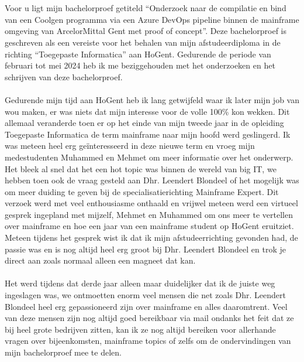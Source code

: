 
\chapter*{}%
\label{ch:voorwoord}

Voor u ligt mijn bachelorproef getiteld \enquote{Onderzoek naar de compilatie en bind van een Coolgen programma via een Azure DevOps pipeline binnen de mainframe omgeving van ArcelorMittal Gent met proof of concept}. 
Deze bachelorproef is geschreven als een vereiste voor het behalen van mijn afstudeerdiploma in de richting \enquote{Toegepaste Informatica} aan HoGent.
Gedurende de periode van februari tot mei 2024 heb ik me beziggehouden met het onderzoeken en het schrijven van deze bachelorproef. 
\\ \\
Gedurende mijn tijd aan HoGent heb ik lang getwijfeld waar ik later mijn job van wou maken, er was niets dat mijn interesse voor de volle 100\% kon wekken. 
Dit allemaal veranderde toen er op het einde van mijn tweede jaar in de opleiding Toegepaste Informatica de term mainframe naar mijn hoofd werd geslingerd. 
Ik was meteen heel erg geïnteresseerd in deze nieuwe term en vroeg mijn medestudenten Muhammed en Mehmet om meer informatie over het onderwerp. 
Het bleek al snel dat het een hot topic was binnen de wereld van big IT, we hebben toen ook de vraag gesteld aan Dhr. Leendert Blondeel of het mogelijk was om meer duiding te geven bij de specialisatierichting Mainframe Expert. 
Dit verzoek werd met veel enthousiasme onthaald en vrijwel meteen werd een virtueel gesprek ingepland met mijzelf, Mehmet en Muhammed om ons meer te vertellen over mainframe en hoe een jaar van een mainframe student op HoGent eruitziet.
Meteen tijdens het gesprek wist ik dat ik mijn afstudeerrichting gevonden had, de passie was en is nog altijd heel erg groot bij Dhr. Leendert Blondeel en trok je direct aan zoals normaal alleen een magneet dat kan. 
\\ \\
Het werd tijdens dat derde jaar alleen maar duidelijker dat ik de juiste weg ingeslagen was, we ontmoetten enorm veel mensen die net zoals Dhr. Leendert Blondeel heel erg gepassioneerd zijn over mainframe en alles daaromtrent. 
Veel van deze mensen zijn nog altijd goed bereikbaar via mail ondanks het feit dat ze bij heel grote bedrijven zitten, kan ik ze nog altijd bereiken voor allerhande vragen over bijeenkomsten, mainframe topics of zelfs om de ondervindingen van mijn bachelorproef mee te delen. 
